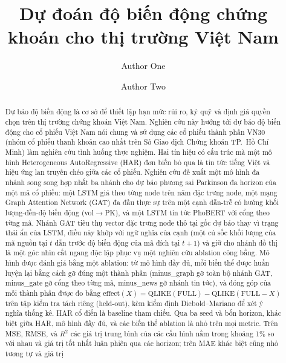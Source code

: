 \documentclass[runningheads]{llncs}
\begin{document}
%
\title{Dự đoán độ biến động chứng khoán cho thị trường Việt Nam}
%
%
\author{Author One \and Author Two}
%
%
\maketitle
%
\begin{abstract}
Dự báo độ biến động là cơ sở để thiết lập hạn mức rủi ro, ký quỹ và định giá quyền chọn trên thị
trường chứng khoán Việt Nam. Nghiên cứu này hướng tới dự báo độ biến động cho cổ phiếu Việt Nam nói
chung và sử dụng các cổ phiếu thành phần VN30 (nhóm cổ phiếu thanh khoản cao nhất trên Sở Giao dịch
Chứng khoán TP.\ Hồ Chí Minh) làm nghiên cứu tình huống thực nghiệm. Hai tín hiệu có cấu trúc mà một
mô hình Heterogeneous AutoRegressive (HAR) đơn biến bỏ qua là tin tức tiếng Việt và hiệu ứng lan
truyền chéo giữa các cổ phiếu. Nghiên cứu đề xuất một mô hình đa nhánh song song hợp nhất ba nhánh cho
dự báo phương sai Parkinson đa horizon của một mã cổ phiếu: một LSTM giá theo từng node trên năm đặc
trưng node, một mạng Graph Attention Network (GAT) đa đầu thực sự trên một cạnh dẫn-trễ có hướng khối
lượng-đến-độ biến động (vol$\to$PK), và một LSTM tin tức PhoBERT với cổng theo từng mã. Nhánh GAT tiêu
thụ vector đặc trưng node thô tại gốc dự báo thay vì trạng thái ẩn của LSTM, điều này khớp với ngữ nghĩa
của cạnh (một cú sốc khối lượng của mã nguồn tại $t$ dẫn trước độ biến động của mã đích tại $t{+}1$) và
giữ cho nhánh đồ thị là một góc nhìn cắt ngang độc lập phục vụ một nghiên cứu ablation công bằng. Mô
hình được đánh giá bằng một ablation: từ mô hình đầy đủ, mỗi biến thể được huấn luyện lại bằng cách gỡ
đúng một thành phần (minus\_graph gỡ toàn bộ nhánh GAT, minus\_gate gỡ cổng theo từng mã, minus\_news
gỡ nhánh tin tức), và đóng góp của mỗi thành phần được đo bằng
$\text{effect}(X)=\text{QLIKE}(\text{FULL})-\text{QLIKE}(\text{FULL}{-}X)$ trên tập kiểm tra tách riêng
(held-out), kèm kiểm định Diebold--Mariano để xét ý nghĩa thống kê. HAR cổ điển là baseline tham chiếu.
Qua ba seed và bốn horizon, khác biệt giữa HAR, mô hình đầy đủ, và các biến thể ablation là nhỏ trên
mọi metric. Trên MSE, RMSE, và $R^2$ các giá trị trung bình của các cấu hình nằm trong khoảng 1\% so với
nhau và giá trị tốt nhất luân phiên qua các horizon; trên MAE khác biệt cũng nhỏ tương tự và giá trị

\end{abstract}
\end{document}
